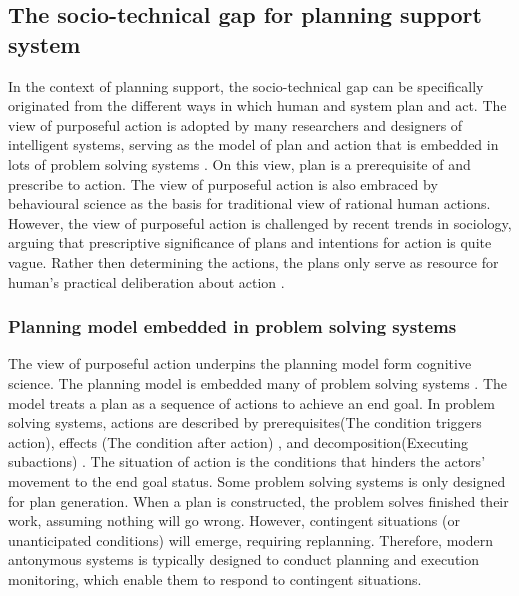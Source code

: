 \subsection{The socio-technical gap for planning support system}
In the context of planning support, the socio-technical gap can be specifically originated from the different ways in which human and system plan and act. The view of purposeful action is adopted by many researchers and designers of intelligent systems, serving as the model of plan and action that is embedded in lots of problem solving systems \cite{Allen1984}. On this view, plan is a prerequisite of and prescribe to action. The view of purposeful action is also embraced by behavioural science as the basis for traditional view of rational human actions. However, the view of purposeful action is challenged by recent trends in sociology, arguing that prescriptive significance of plans and intentions for action is quite vague. Rather then determining the actions, the plans only serve as resource for human's practical deliberation about action \cite{Suchman1987}.\\  

\subsubsection{Planning model embedded in problem solving systems }
The view of purposeful action underpins the planning model form cognitive science. The planning model is embedded many of problem solving systems \cite{Suchman1987}. The model treats a plan as a sequence of actions to achieve an end goal. In problem solving systems, actions are described by prerequisites(The condition triggers action), effects (The condition after action) , and decomposition(Executing subactions) \cite{Allen1984}. The situation of action is the conditions that hinders the actors' movement to the end goal status. Some problem solving systems is only designed for plan generation. When a plan is constructed, the problem solves finished their work, assuming nothing will go wrong. However, contingent situations (or unanticipated conditions) will emerge, requiring  \cite{Suchman1987} replanning. Therefore, modern antonymous systems is typically designed to conduct planning and execution monitoring, which enable them to respond to contingent situations.\\


